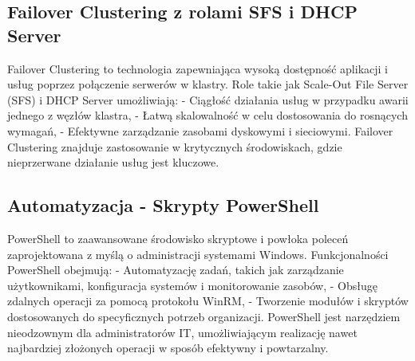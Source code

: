 \subsection{Failover Clustering z rolami SFS i DHCP Server}
Failover Clustering to technologia zapewniająca wysoką dostępność aplikacji i usług poprzez połączenie serwerów w klastry. Role takie jak Scale-Out File Server (SFS) i DHCP Server umożliwiają:
- Ciągłość działania usług w przypadku awarii jednego z węzłów klastra,
- Łatwą skalowalność w celu dostosowania do rosnących wymagań,
- Efektywne zarządzanie zasobami dyskowymi i sieciowymi.
Failover Clustering znajduje zastosowanie w krytycznych środowiskach, gdzie nieprzerwane działanie usług jest kluczowe.

\subsection{Automatyzacja - Skrypty PowerShell}
PowerShell to zaawansowane środowisko skryptowe i powłoka poleceń zaprojektowana z myślą o administracji systemami Windows. Funkcjonalności PowerShell obejmują:
- Automatyzację zadań, takich jak zarządzanie użytkownikami, konfiguracja systemów i monitorowanie zasobów,
- Obsługę zdalnych operacji za pomocą protokołu WinRM,
- Tworzenie modułów i skryptów dostosowanych do specyficznych potrzeb organizacji.
PowerShell jest narzędziem nieodzownym dla administratorów IT, umożliwiającym realizację nawet najbardziej złożonych operacji w sposób efektywny i powtarzalny.
